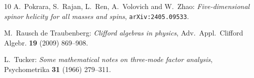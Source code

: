 \documentclass[english]{ourlematema}
\numberwithin{theorem}{section}
\theoremstyle{definition}
\begin{document}
\begin{small}
\begin{thebibliography}{10}
 A.~Pokrara, S.~Rajan, L.~Ren, A.~Volovich and W.~Zhao:
{\em Five-dimensional spinor helicity for all masses and spins},
{\tt arXiv:2405.09533}.

 M.~Rausch de Traubenberg:
 {\em Clifford algebras in physics},
Adv.~Appl.~Clifford Algebr. {\bf 19} (2009) 869--908.

 L.~Tucker: {\em Some mathematical notes on three-mode factor analysis}, 
 Psychometrika {\bf 31} (1966) 279--311.

\end{thebibliography}
\end{small}
\end{document}
